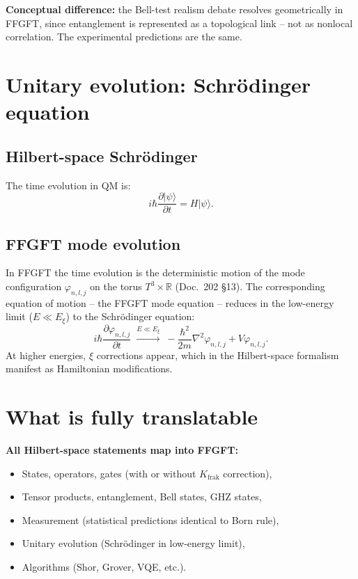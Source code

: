 \textbf{Conceptual difference:} the Bell-test realism debate
resolves geometrically in FFGFT, since entanglement is represented
as a topological link -- not as nonlocal correlation. The
experimental predictions are the same.

\section{Unitary evolution: Schrödinger equation}

\subsection{Hilbert-space Schrödinger}

The time evolution in QM is:
\begin{equation}
  i\hbar \frac{\partial |\psi\rangle}{\partial t} = H |\psi\rangle.
\end{equation}

\subsection{FFGFT mode evolution}

In FFGFT the time evolution is the deterministic motion of the
mode configuration $\varphi_{n,l,j}$ on the torus
$T^3 \times \mathbb{R}$ (Doc.~202 §13). The corresponding
equation of motion -- the FFGFT mode equation -- reduces in the
low-energy limit ($E \ll E_\xi$) to the Schrödinger equation:
\begin{equation}
  i\hbar \frac{\partial \varphi_{n,l,j}}{\partial t}
  \;\xrightarrow{E \ll E_\xi}\;
  -\frac{\hbar^2}{2m}\nabla^2 \varphi_{n,l,j} + V \varphi_{n,l,j}.
\end{equation}
At higher energies, $\xi$ corrections appear, which in the
Hilbert-space formalism manifest as Hamiltonian modifications.

\section{What is fully translatable}

\textbf{All Hilbert-space statements map into FFGFT:}
\begin{itemize}[leftmargin=2em,itemsep=2pt,topsep=2pt]
  \item States, operators, gates (with or without $K_{\text{frak}}$ correction),
  \item Tensor products, entanglement, Bell states, GHZ states,
  \item Measurement (statistical predictions identical to Born rule),
  \item Unitary evolution (Schrödinger in low-energy limit),
  \item Algorithms (Shor, Grover, VQE, etc.).
\end{itemize}

